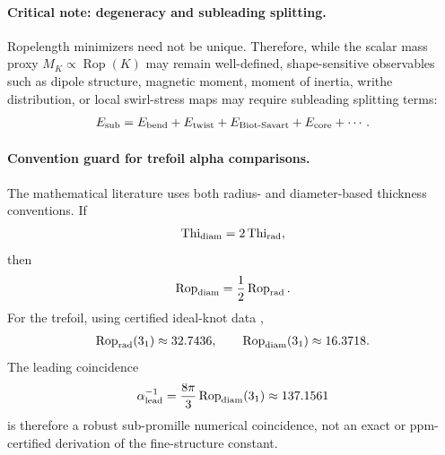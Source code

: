 \documentclass[11pt]{article}
\theoremstyle{definition}
\theoremstyle{plain}
\theoremstyle{remark}
\begin{document}
        \paragraph{Critical note: degeneracy and subleading splitting.}
        Ropelength minimizers need not be unique.  Therefore, while the scalar
        mass proxy \(M_K\propto\operatorname{Rop}(K)\) may remain well-defined,
        shape-sensitive observables such as dipole structure, magnetic moment,
        moment of inertia, writhe distribution, or local swirl-stress maps may
        require subleading splitting terms:
        \begin{align}
            E_{\rm sub}
            =
            E_{\rm bend}
            +
            E_{\rm twist}
            +
            E_{\rm Biot\text{-}Savart}
            +
            E_{\rm core}
            +
            \cdots .
        \end{align}

        \paragraph{Convention guard for trefoil alpha comparisons.}
        The mathematical literature uses both radius- and diameter-based thickness
        conventions.  If
        \begin{align}
            \operatorname{Thi}_{\rm diam}=2\operatorname{Thi}_{\rm rad},
        \end{align}
        then
        \begin{align}
            \operatorname{Rop}_{\rm diam}
            =
            \frac12\operatorname{Rop}_{\rm rad}.
        \end{align}
        For the trefoil, using certified ideal-knot data
        \cite{AshtonCantarellaPiatekRawdon2011},
        \begin{align}
            \operatorname{Rop}_{\rm rad}(3_1)\approx32.7436,
            \qquad
            \operatorname{Rop}_{\rm diam}(3_1)\approx16.3718 .
        \end{align}
        The leading coincidence
        \begin{align}
            \alpha^{-1}_{\rm lead}
            =
            \frac{8\pi}{3}\operatorname{Rop}_{\rm diam}(3_1)
            \approx
            137.1561
        \end{align}
        is therefore a robust sub-promille numerical coincidence, not an exact
        or ppm-certified derivation of the fine-structure constant.
\end{document}

